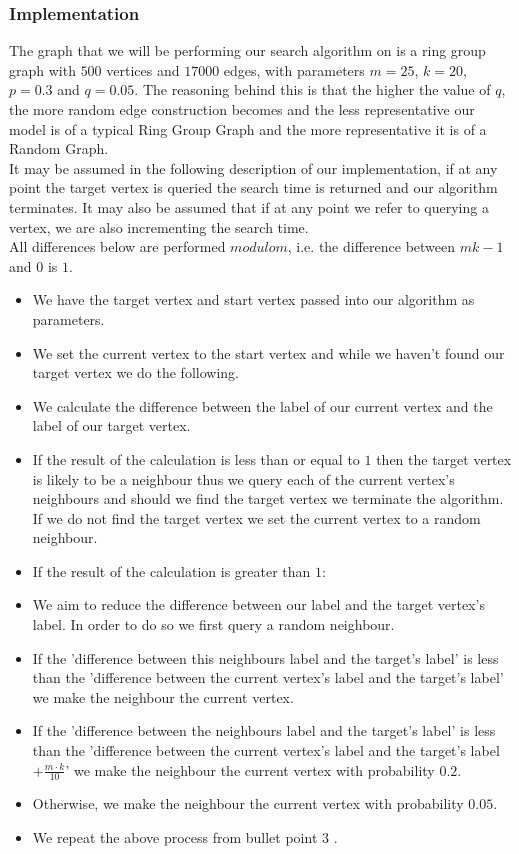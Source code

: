 \documentclass[12pt, a4paper]{article}
\begin{document}
\subsubsection*{Implementation}
The graph that we will be performing our search algorithm on is a ring group graph with $500$ vertices and $17000$ edges, with parameters $m = 25$, $k=20$, $p=0.3$ and $q=0.05$. The reasoning behind this is that the higher the value of $q$, the more random edge construction becomes and the less representative our model is of a typical Ring Group Graph and the more representative it is of a Random Graph.\\
It may be assumed in the following description of our implementation, if at any point the target vertex is queried the search time is returned and our algorithm terminates. It may also be assumed that if at any point we refer to querying a vertex, we are also incrementing the search time.\\
All differences below are performed $modulo m$, i.e. the difference between $mk -1$ and $0$ is $1$.\\
\begin{itemize}
\renewcommand\labelitemi{\tiny$\bullet$}
\item We have the target vertex and start vertex passed into our algorithm as parameters.
\item We set the current vertex to the start vertex and while we haven't found our target vertex we do the following.
\item We calculate the difference between the label of our current vertex and the label of our target vertex. 
\item If the result of the calculation is less than or equal to $1$ then the target vertex is likely to be a neighbour thus we query each of the current vertex's neighbours and should we find the target vertex we terminate the algorithm. If we do not find the target vertex we set the current vertex to a random neighbour. 
\item If the result of the calculation is greater than $1$:
\item We aim to reduce the difference between our label and the target vertex's label. In order to do so we first query a random neighbour. 
\item If the 'difference between this neighbours label and the target's label' is less than the 'difference between the current vertex's label and the target's label' we make the neighbour the current vertex. 
\item If the 'difference between the neighbours label and the target's label' is less than the 'difference between the current vertex's label  and the target's label $+ \frac{m\cdot k}{10}$' we make the neighbour the current vertex with probability $0.2$. 
\item Otherwise, we make the neighbour the current vertex with probability $0.05$.
\item We repeat the above process from bullet point $3$ .
\end{itemize}
\newpage
\end{document}
